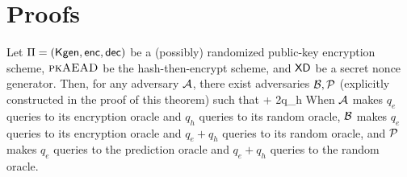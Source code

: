 \section{Proofs}
\label{sec:proofs}

\begin{theorem}
Let $\Pi=(\mathsf{Kgen},\mathsf{enc},\mathsf{dec})$ be a (possibly) randomized public-key encryption scheme, $\textsc{pkAEAD}$ be the hash-then-encrypt scheme, and $\mathsf{XD}$ be a secret nonce generator.  Then, for any adversary ${\cal A}$, there exist adversaries ${\cal B},{\cal P}$ (explicitly constructed in the proof of this theorem) such that
\bne
\AdvINDCDA{\kreg,\mdalg,\pkaead}{\advA} \leq \AdvINDCPA{\Pi}{\advB} + 2q_h
\ene
When ${\cal A}$ makes $q_e$ queries to its encryption oracle and $q_h$ queries to its random oracle, ${\cal B}$ makes $q_e$ queries to its encryption oracle and $q_e + q_h$ queries to its random oracle, and ${\cal P}$ makes $q_e$ queries to the prediction oracle and $q_e + q_h$ queries to the random oracle. 
\end{theorem}

